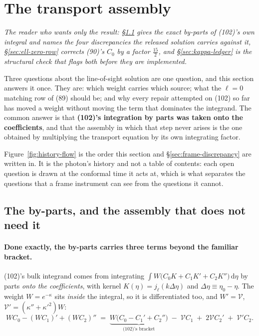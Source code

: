 \section{The transport assembly}
\label{sec:transport-assembly}

\emph{The reader who wants only the result: \S\ref{sec:w-form} gives the
exact by-parts of (102)'s own integral and names the four discrepancies the
released solution carries against it, \S\ref{sec:ell-zero-row} corrects (90)'s
$C_0$ by a factor $\tfrac{15}2$, and \S\ref{sec:kappa-ledger} is the
structural check that flags both before they are implemented.}

Three questions about the line-of-sight solution are one question, and this
section answers it once. They are: which weight carries which source; what the
$\ell=0$ matching row of (89) should be; and why every repair attempted on
(102) so far has moved a weight without moving the term that dominates the
integrand. The common answer is that \textbf{(102)'s integration by parts was
taken onto the coefficients}, and that the assembly in which that step never
arises is the one obtained by multiplying the transport equation by its own
integrating factor.



Figure~\ref{fig:history-flow} is the order this section and
\S\ref{sec:frame-discrepancy} are written in. It is the photon's history and
not a table of contents: each open question is drawn at the conformal time it
acts at, which is what separates the questions that a frame instrument can see
from the questions it cannot.

\subsection{The by-parts, and the assembly that does not need it}
\label{sec:w-form}

\paragraph{Done exactly, the by-parts carries three terms beyond the familiar
bracket.} (102)'s bulk integrand comes from integrating
$\int W\big(C_0K+C_1K'+C_2K''\big)\,\mathrm d\eta$ by parts \emph{onto the
coefficients}, with kernel $K(\eta)=j_\ell(k\Delta\eta)$ and
$\Delta\eta\equiv\eta_0-\eta$. The weight $W=e^{-\kappa}$ sits \emph{inside}
the integral, so it is differentiated too, and
$W'=\mathcal V$, $\mathcal V'=(\kappa''+\kappa'^2)W$:
\begin{equation}
  WC_0-(WC_1)'+(WC_2)''
  \;=\;\underbrace{W\big(C_0-C_1'+C_2''\big)}_{\text{(102)'s bracket}}
  \;-\;\mathcal VC_1\;+\;2\mathcal VC_2'\;+\;\mathcal V'C_2 .
  \label{eq:byparts}
\end{equation}

